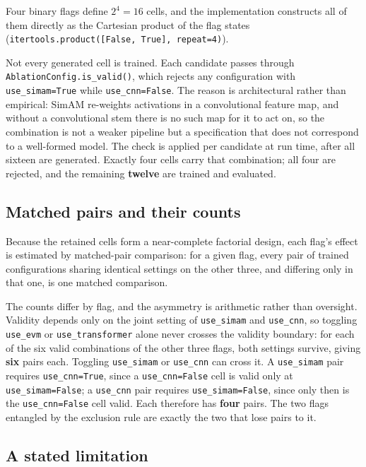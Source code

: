 Four binary flags define $2^4 = 16$ cells, and the implementation constructs all of them directly as the Cartesian product of the flag states (\verb|itertools.product([False, True], repeat=4)|).

Not every generated cell is trained. Each candidate passes through \verb|AblationConfig.is_valid()|, which rejects any configuration with \texttt{use\_simam=True} while \texttt{use\_cnn=False}. The reason is architectural rather than empirical: SimAM re-weights activations in a convolutional feature map, and without a convolutional stem there is no such map for it to act on, so the combination is not a weaker pipeline but a specification that does not correspond to a well-formed model. The check is applied per candidate at run time, after all sixteen are generated. Exactly four cells carry that combination; all four are rejected, and the remaining \textbf{twelve} are trained and evaluated.

\subsection{Matched pairs and their counts}
\label{sec:matched-pairs}

Because the retained cells form a near-complete factorial design, each flag's effect is estimated by matched-pair comparison: for a given flag, every pair of trained configurations sharing identical settings on the other three, and differing only in that one, is one matched comparison.

The counts differ by flag, and the asymmetry is arithmetic rather than oversight. Validity depends only on the joint setting of \texttt{use\_simam} and \texttt{use\_cnn}, so toggling \texttt{use\_evm} or \texttt{use\_transformer} alone never crosses the validity boundary: for each of the six valid combinations of the other three flags, both settings survive, giving \textbf{six} pairs each. Toggling \texttt{use\_simam} or \texttt{use\_cnn} can cross it. A \texttt{use\_simam} pair requires \texttt{use\_cnn=True}, since a \texttt{use\_cnn=False} cell is valid only at \texttt{use\_simam=False}; a \texttt{use\_cnn} pair requires \texttt{use\_simam=False}, since only then is the \texttt{use\_cnn=False} cell valid. Each therefore has \textbf{four} pairs. The two flags entangled by the exclusion rule are exactly the two that lose pairs to it.

\subsection{A stated limitation}
\label{sec:design-limitation}

